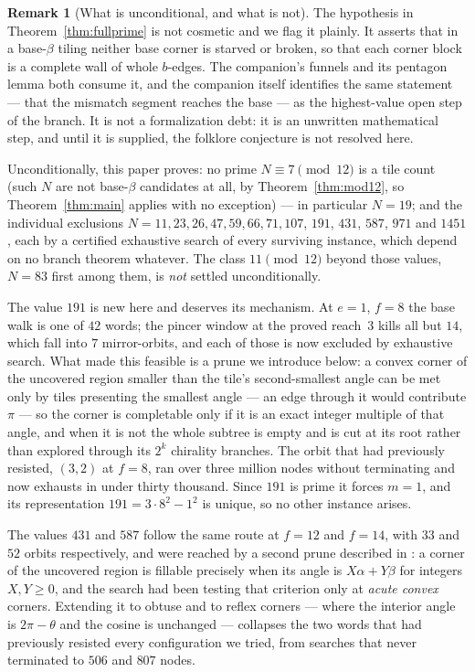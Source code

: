 \documentclass[11pt,reqno]{amsart}
\theoremstyle{plain}
\theoremstyle{definition}
\newtheorem{remark}[theorem]{Remark}
\begin{document}
\begin{remark}[What is unconditional, and what is not]\label{rem:conditional}
The hypothesis in Theorem~\ref{thm:fullprime} is not cosmetic and we flag it plainly. It asserts that
in a base-$\beta$ tiling neither base corner is starved or broken, so that each corner block is a
complete wall of whole $b$-edges. The companion's funnels and its pentagon lemma both consume it, and
the companion itself identifies the same statement --- that the mismatch segment reaches the base ---
as the highest-value open step of the branch. It is not a formalization debt: it is an unwritten
mathematical step, and until it is supplied, the folklore conjecture is not resolved here.

Unconditionally, this paper proves: no prime $N\equiv7\pmod{12}$ is a tile count (such $N$ are not
base-$\beta$ candidates at all, by Theorem~\ref{thm:mod12}, so Theorem~\ref{thm:main} applies with no
exception) --- in particular $N=19$; and the individual exclusions
$N=11,23,26,47,59,66,71,107$, $191$, $431$, $587$, $971$ and $1451$, each by a certified exhaustive search of
every surviving instance, which depend on no branch theorem whatever. The class $11\pmod{12}$ beyond those values,
$N=83$ first among them, is \emph{not} settled unconditionally.

The value $191$ is new here and deserves its mechanism. At $e=1$, $f=8$ the base walk is one of
$42$ words; the pincer window at the proved reach~$3$ kills all but $14$, which fall into $7$
mirror-orbits, and each of those is now excluded by exhaustive search. What made this feasible is a
prune we introduce below: a convex corner of the uncovered region smaller than the tile's
second-smallest angle can be met only by tiles presenting the smallest angle --- an edge through it
would contribute $\pi$ --- so the corner is completable only if it is an exact integer multiple of
that angle, and when it is not the whole subtree is empty and is cut at its root rather than
explored through its $2^{k}$ chirality branches. The orbit that had previously resisted, $(3,2)$ at
$f=8$, ran over three million nodes without terminating and now exhausts in under thirty thousand.
Since $191$ is prime it forces $m=1$, and its representation $191=3\cdot8^{2}-1^{2}$ is unique, so
no other instance arises.

The values $431$ and $587$ follow the same route at $f=12$ and $f=14$, with $33$ and $52$ orbits
respectively, and were reached by a second prune described in \cite{Obstructions}: a corner of the
uncovered region is fillable precisely when its angle is $X\alpha+Y\beta$ for integers
$X,Y\ge0$, and the search had been testing that criterion only at \emph{acute convex} corners.
Extending it to obtuse and to reflex corners --- where the interior angle is $2\pi-\theta$ and the
cosine is unchanged --- collapses the two words that had previously resisted every configuration we
tried, from searches that never terminated to $506$ and $807$ nodes.


\end{remark}
\end{document}
